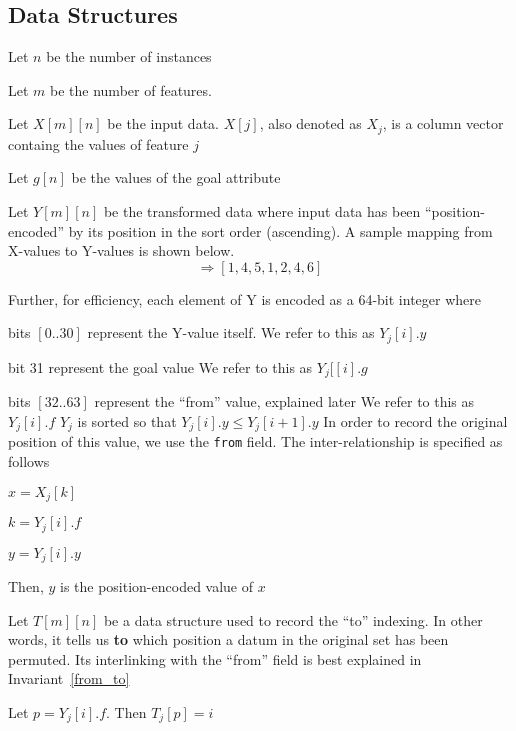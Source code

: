 \documentclass[12pt,letterpaper]{article}
\begin{document}
\subsection{Data Structures}

\be
\item Let \(n\) be the number of instances
\item Let \(m\) be the number of features. 
\item Let \(X[m][n]\) be the input data. \(X[j]\), also denoted as \(X_j\),  is a column vector containg
  the values of feature \(j\)
\item Let \(g[n]\) be the values of the goal attribute
\item Let \(Y[m][n]\) be the transformed data where input data has been
  ``position-encoded'' 
  by its position in the sort order (ascending). A sample mapping from 
  X-values to Y-values is shown below.
\begin{displaymath}
[11, 32, 47, 11, 17, 28, 32, 55] \Rightarrow [1, 4, 5, 1, 2, 4, 6]
\end{displaymath}

Further, for efficiency, each element of Y is encoded as a 64-bit integer where 
\bi
\item bits \([0..30]\) represent the Y-value itself. 
  We refer to this as \(Y_j[i].y\)
\item bit 31 represent the goal value
  We refer to this as \(Y_j[[i].g\)
\item bits \([32..63]\) represent the ``from'' value, explained later
  We refer to this as \(Y_j[i].f\)
  \ei
\(Y_j\) is sorted so that \(Y_j[i].y \leq Y_j[i+1].y\)
In order to record the original position of this value, we use the {\tt from}
field. The inter-relationship is specified as follows
\bi
\item \(x = X_j[k]\)
\item \(k = Y_j[i].f\)
\item \(y = Y_j[i].y\)
\item Then, \(y\) is the position-encoded value of \(x\)
  \ei

\item Let \(T[m][n]\) be a data structure used to record the ``to'' indexing. In
  other words, it tells us {\bf to} which position a datum in the original set
  has been permuted. Its interlinking with the ``from'' field is best explained
  in Invariant~\ref{from_to}
  \ee

\begin{invariant}
  \label{from_to}
  Let \(p = Y_j[i].f\). Then \(T_j[p] = i\)

\end{invariant}
\end{document}
